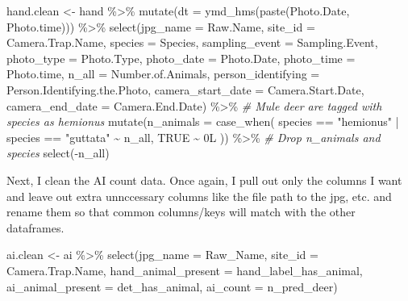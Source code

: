 \documentclass[
]{book}
\newenvironment{Shaded}{\begin{snugshade}}{\end{snugshade}}
\newcommand{\AttributeTok}[1]{\textcolor[rgb]{0.77,0.63,0.00}{#1}}
\newcommand{\CommentTok}[1]{\textcolor[rgb]{0.56,0.35,0.01}{\textit{#1}}}
\newcommand{\ConstantTok}[1]{\textcolor[rgb]{0.00,0.00,0.00}{#1}}
\newcommand{\FunctionTok}[1]{\textcolor[rgb]{0.00,0.00,0.00}{#1}}
\newcommand{\NormalTok}[1]{#1}
\newcommand{\OtherTok}[1]{\textcolor[rgb]{0.56,0.35,0.01}{#1}}
\newcommand{\SpecialCharTok}[1]{\textcolor[rgb]{0.00,0.00,0.00}{#1}}
\newcommand{\StringTok}[1]{\textcolor[rgb]{0.31,0.60,0.02}{#1}}
\begin{document}
\begin{Shaded}
\begin{Highlighting}[]
\NormalTok{hand.clean }\OtherTok{\textless{}{-}}\NormalTok{ hand }\SpecialCharTok{\%\textgreater{}\%} 
  \FunctionTok{mutate}\NormalTok{(}\AttributeTok{dt =} \FunctionTok{ymd\_hms}\NormalTok{(}\FunctionTok{paste}\NormalTok{(Photo.Date, Photo.time))) }\SpecialCharTok{\%\textgreater{}\%} 
  \FunctionTok{select}\NormalTok{(}\AttributeTok{jpg\_name =}\NormalTok{ Raw.Name,}
         \AttributeTok{site\_id =}\NormalTok{ Camera.Trap.Name,}
         \AttributeTok{species =}\NormalTok{ Species,}
         \AttributeTok{sampling\_event =}\NormalTok{ Sampling.Event,}
         \AttributeTok{photo\_type =}\NormalTok{ Photo.Type,}
         \AttributeTok{photo\_date =}\NormalTok{ Photo.Date,}
         \AttributeTok{photo\_time =}\NormalTok{ Photo.time,}
         \AttributeTok{n\_all =}\NormalTok{ Number.of.Animals,}
         \AttributeTok{person\_identifying =}\NormalTok{ Person.Identifying.the.Photo,}
         \AttributeTok{camera\_start\_date =}\NormalTok{ Camera.Start.Date,}
         \AttributeTok{camera\_end\_date =}\NormalTok{ Camera.End.Date) }\SpecialCharTok{\%\textgreater{}\%} 
  \CommentTok{\# Mule deer are tagged with species as \textquotesingle{}hemionus\textquotesingle{}}
  \FunctionTok{mutate}\NormalTok{(}\AttributeTok{n\_animals =} \FunctionTok{case\_when}\NormalTok{(}
\NormalTok{    species }\SpecialCharTok{==} \StringTok{"hemionus"} \SpecialCharTok{|}\NormalTok{ species }\SpecialCharTok{==} \StringTok{"guttata"} \SpecialCharTok{\textasciitilde{}}\NormalTok{ n\_all,}
    \ConstantTok{TRUE} \SpecialCharTok{\textasciitilde{}}\NormalTok{ 0L}
\NormalTok{  )) }\SpecialCharTok{\%\textgreater{}\%} 
  \CommentTok{\# Drop n\_animals and species}
  \FunctionTok{select}\NormalTok{(}\SpecialCharTok{{-}}\NormalTok{n\_all)}
\end{Highlighting}
\end{Shaded}

Next, I clean the AI count data. Once again, I pull out only the columns I want and leave out extra unnccessary columns like the file path to the jpg, etc. and rename them so that common columns/keys will match with the other dataframes.

\begin{Shaded}
\begin{Highlighting}[]
\NormalTok{ai.clean }\OtherTok{\textless{}{-}}\NormalTok{ ai }\SpecialCharTok{\%\textgreater{}\%} 
  \FunctionTok{select}\NormalTok{(}\AttributeTok{jpg\_name =}\NormalTok{ Raw\_Name,}
         \AttributeTok{site\_id =}\NormalTok{ Camera.Trap.Name,}
         \AttributeTok{hand\_animal\_present =}\NormalTok{ hand\_label\_has\_animal,}
         \AttributeTok{ai\_animal\_present =}\NormalTok{ det\_has\_animal,}
         \AttributeTok{ai\_count =}\NormalTok{ n\_pred\_deer)}
\end{Highlighting}
\end{Shaded}
\end{document}
